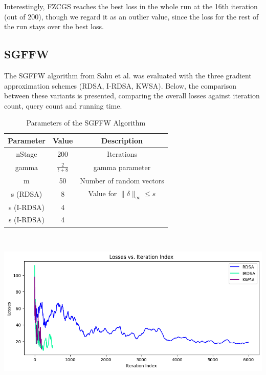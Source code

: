 \documentclass[10pt,twocolumn,letterpaper]{article}
\begin{document}
Interestingly, FZCGS reaches the best loss in the whole run at the 16th iteration (out of 200), though
we regard it as an outlier value, since the loss for the rest of the run stays over the best loss.



\subsection{SGFFW}

The SGFFW algorithm from Sahu et al. was evaluated with the three
gradient approximation schemes (RDSA, I-RDSA, KWSA).
Below, the comparison between these variants is presented,
comparing the overall losses against iteration count, query count and running time.


\begin{table}[h]
   \centering
   \begin{tabular}{ccc}
       \hline
       Parameter & Value & Description \\
       \hline
       nStage & 200 & Iterations\\
       \hline
       gamma & $\frac{2}{t+8}$ & gamma parameter \\
       \hline
       m & 50 & Number of random vectors\\
       \hline
       s (RDSA) & 8 & Value for $\|\delta\|_{\infty} \leq s$\\
       s (I-RDSA) & 4 & \\
       s (I-RDSA) & 4 & \\
       \hline
   \end{tabular}
   \
   \caption{Parameters of the SGFFW Algorithm} 
   \label{tab:sgffw_params}
\end{table}


\begin{center}
   \includegraphics*[scale=0.35]{img/SGFFW_loss_vs_iterations.png}
\end{center}
\end{document}
